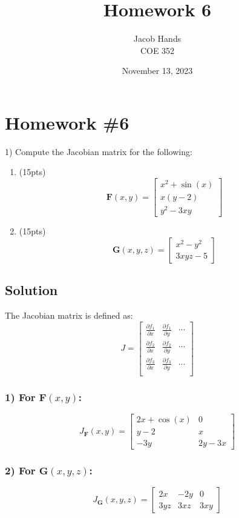 \documentclass[11pt]{article}
\title{Homework 6}
\author{Jacob Hands \\ COE 352}
\date{November 13, 2023}
\begin{document}
\maketitle

\section*{Homework \#6}

1) Compute the Jacobian matrix for the following:
\begin{enumerate}
    \item (15pts)
    \[
    \bm{F}(x, y) =
    \begin{bmatrix}
        x^2 + \sin(x) \\
        x(y - 2) \\
        y^2 - 3xy
    \end{bmatrix}
    \]

    \item (15pts)
    \[
    \bm{G}(x, y, z) =
    \begin{bmatrix}
        x^2 - y^2 \\
        3xyz - 5
    \end{bmatrix}
    \]
\end{enumerate}

\subsection*{Solution}
The Jacobian matrix is defined as:
\[
J =
\begin{bmatrix}
    \frac{\partial f_1}{\partial x} & \frac{\partial f_1}{\partial y} & \cdots \\
    \frac{\partial f_2}{\partial x} & \frac{\partial f_2}{\partial y} & \cdots \\
    \frac{\partial f_3}{\partial x} & \frac{\partial f_3}{\partial y} & \cdots \\
\end{bmatrix}
\]

\subsubsection*{1) For \(\bm{F}(x, y)\):}
\[
J_{\bm{F}}(x, y) =
\begin{bmatrix}
    2x + \cos(x) & 0 \\
    y - 2 & x  \\
    -3y & 2y - 3x 
\end{bmatrix}
\]

\subsubsection*{2) For \(\bm{G}(x, y, z)\):}
\[
J_{\bm{G}}(x, y, z) =
\begin{bmatrix}
    2x & -2y & 0 \\
    3yz & 3xz & 3xy
\end{bmatrix}
\]
\end{document}
